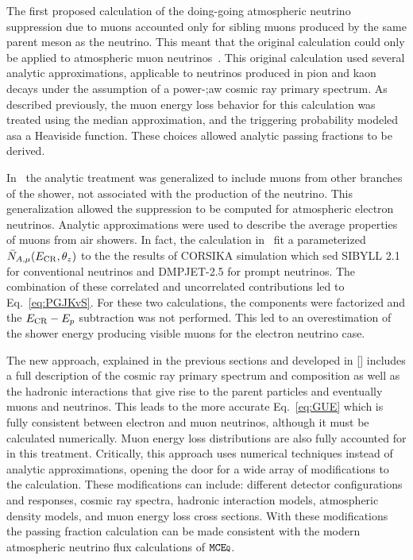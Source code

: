 The first proposed calculation of the doing-going atmospheric neutrino suppression due to muons accounted only for sibling muons produced by the same parent meson as the neutrino.
This meant that the original calculation could only be applied to atmospheric muon neutrinos~\cite{Schonert:2008is}.
This original calculation used several analytic approximations, applicable to neutrinos produced in pion and kaon decays under the assumption of a power-;aw cosmic ray primary spectrum.
As described previously, the muon energy loss behavior for this calculation was treated using the median approximation, and the triggering probability modeled asa a Heaviside function.
These choices allowed analytic passing fractions to be derived.

In~\cite{Gaisser:2014bja} the analytic treatment was generalized to include muons from other branches of the shower, not associated with the production of the neutrino.
This generalization allowed the suppression to be computed for atmospheric electron neutrinos.
Analytic approximations were used to describe the average properties of muons from air showers.
In fact, the calculation in~\cite{Gaisser:2014bja} fit a parameterized $\bar N_{A,\mu}(E_{\rm CR}, \theta_z)$ to the the results of CORSIKA simulation which sed SIBYLL 2.1 for conventional neutrinos and DMPJET-2.5 for prompt neutrinos.
The combination of these correlated and uncorrelated contributions led to Eq.~\ref{eq:PGJKvS}.
For these two calculations, the components were factorized and the $E_{\rm CR}-E_p$ subtraction was not performed.
This led to an overestimation of the shower energy producing visible muons for the electron neutrino case.

The new approach, explained in the previous sections and developed in [] includes a full description of the cosmic ray primary spectrum and composition as well as the hadronic interactions that give rise to the parent particles and eventually muons and neutrinos.
This leads to the more accurate Eq.~\ref{eq:GUE} which is fully consistent between electron and muon neutrinos, although it must be calculated numerically.
Muon energy loss distributions are also fully accounted for in this treatment.
Critically, this approach uses numerical techniques instead of analytic approximations, opening the door for a wide array of modifications to the calculation.
These modifications can include: different detector configurations and responses, cosmic ray spectra, hadronic interaction models, atmospheric density models, and muon energy loss cross sections.
With these modifications the passing fraction calculation can be made consistent with the modern atmospheric neutrino flux calculations of $\texttt{MCE{\scriptsize Q}}$.

